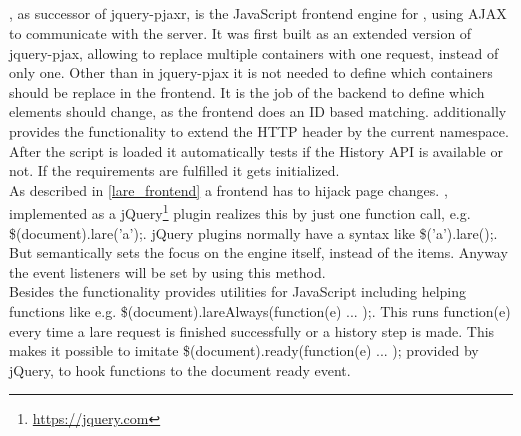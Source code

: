 \subsection{\lareJS{}}
\lareJS{}, as successor of jquery-pjaxr, is the JavaScript frontend engine for \lare{}, using AJAX to communicate with the server.
It was first built as an extended version of jquery-pjax, allowing to replace multiple containers with one request, instead of only one.
Other than in jquery-pjax it is not needed to define which containers should be replace in the frontend.
It is the job of the backend to define which elements should change, as the frontend does an ID based matching.
\lareJS{} additionally provides the functionality to extend the HTTP header by the current \lare{} namespace.
\\
After the script is loaded it automatically tests if the History API is available or not.
If the requirements are fulfilled it gets initialized.
\\
As described in \ref{lare_frontend} a \lare{} frontend has to hijack page changes.
\lareJS{}, implemented as a jQuery\footnote{\url{https://jquery.com}} plugin realizes this by just one function call, e.g. \$(document).lare('a');.
jQuery plugins normally have a syntax like \$('a').lare();.
But semantically \lareJS{} sets the focus on the engine itself, instead of the items.
Anyway the event listeners will be set by using this method.
\\
Besides the \lare{} functionality \lareJS{} provides utilities for JavaScript including helping functions like e.g. \$(document).lareAlways(function(e) { ... });.
This runs function(e) {} every time a lare request is finished successfully or a history step is made.
This makes it possible to imitate \$(document).ready(function(e) { ... }); provided by jQuery, to hook functions to the document ready event.